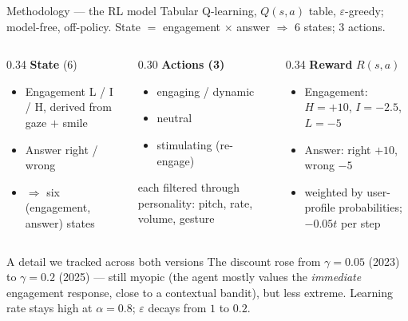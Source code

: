 \documentclass[aspectratio=169,10pt]{beamer}
\begin{document}
\begin{frame}{Methodology --- the RL model}
  \footnotesize Tabular Q-learning, $Q(s,a)$ table, $\varepsilon$-greedy; model-free, off-policy. State $=$ engagement $\times$ answer $\Rightarrow$ 6 states; 3 actions.
  \vspace{0.3em}
  \begin{columns}[T]
    \begin{column}{0.34\textwidth}
      \textbf{State} (6)
      \begin{itemize}\footnotesize
        \item Engagement L / I / H, derived from gaze $+$ smile
        \item Answer right / wrong
        \item $\Rightarrow$ six (engagement, answer) states
      \end{itemize}
    \end{column}
    \begin{column}{0.30\textwidth}
      \textbf{Actions (3)}
      \begin{itemize}\footnotesize
        \item engaging / dynamic
        \item neutral
        \item stimulating (re-engage)
      \end{itemize}
      {\scriptsize each filtered through personality: pitch, rate, volume, gesture}
    \end{column}
    \begin{column}{0.34\textwidth}
      \textbf{Reward} $R(s,a)$
      \begin{itemize}\footnotesize
        \item Engagement: $H{=}{+}10$, $I{=}{-}2.5$, $L{=}{-}5$
        \item Answer: right ${+}10$, wrong ${-}5$
        \item weighted by user-profile probabilities; ${-}0.05t$ per step
      \end{itemize}
    \end{column}
  \end{columns}
  \vspace{0.3em}
  \begin{alertblock}{A detail we tracked across both versions}
    The discount rose from $\gamma=0.05$ (2023) to $\gamma=0.2$ (2025) --- still myopic (the agent mostly values the \emph{immediate} engagement response, close to a contextual bandit), but less extreme. Learning rate stays high at $\alpha=0.8$; $\varepsilon$ decays from $1$ to $0.2$.
  \end{alertblock}
\end{frame}
 
\end{document}
